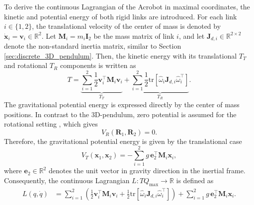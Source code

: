 To derive the continuous Lagrangian of the Acrobot in maximal coordinates, the
kinetic and potential energy of both rigid links are introduced. For each link
\(i\in\{1,2\}\), the translational velocity of the center of mass is denoted by
\(\dot{\bm{x}}_i=\bm{v}_i\in\mathbb{R}^2\). Let $\bm{M}_i = m_i\bm{I}_2$ be the mass matrix of link \(i\), and let \(\bm{J}_{d,i}\in\mathbb{R}^{2\times 2}\)
denote the non-standard inertia matrix, similar to Section \ref{sec:discrete_3D_pendulum}. Then, the
kinetic energy with its translational $T_T$ and rotational $T_R$ components is written as
\begin{equation}
    T
    =
    \underbrace{
    \sum_{i=1}^{2}
    \frac{1}{2}\bm{v}_i^{\top}\bm{M}_i\bm{v}_i
    }_{T_T}
    +
    \underbrace{
    \sum_{i=1}^{2}
    \frac{1}{2}
    \mathrm{tr}
    \left[
        \hat{\omega}_i
        \bm{J}_{d,i}
        \hat{\omega}_i^{\top}
    \right]
    }_{T_R}.
    \label{eq:acrobot_kinetic_energy_split}
\end{equation}
The gravitational potential energy is expressed directly by the center of mass
positions. In contrast to the 3D-pendulum, zero potential is assumed for the rotational setting \cite{BrudigamManchester2021VariationalIntegrators}, 
which gives 
\begin{equation}
    V_R(\bm{R}_1,\bm{R}_2)=0.
    \label{eq:acrobot_rotation_potential_zero}
\end{equation}
Therefore, the gravitational potential energy is given by the translational case
\begin{equation}
    V_T(\bm{x}_1,\bm{x}_2)
    =
    -
    \sum_{i=1}^{2}
    g\,\bm{e}_2^{\top}\bm{M}_i\bm{x}_i,
    \label{eq:acrobot_potential_energy}
\end{equation}
where \(\bm{e}_2\in\mathbb{R}^2\) denotes the unit vector in gravity direction in the inertial frame.
Consequently, the continuous Lagrangian
\(L:TQ_{\mathrm{max}}\rightarrow\mathbb{R}\) is defined as
\begin{equation}
    \begin{aligned}
    L(q,\dot{q})
    &=
    \sum_{i=1}^{2}
    \left(
    \frac{1}{2}\bm{v}_i^{\top}\bm{M}_i\bm{v}_i
    +
    \frac{1}{2}
    \mathrm{tr}
    \left[
        \hat{\omega}_i
        \bm{J}_{d,i}
        \hat{\omega}_i^{\top}
    \right]
    \right)
    +
    \sum_{i=1}^{2}
    g\,\bm{e}_2^{\top}\bm{M}_i\bm{x}_i .
    \end{aligned}
    \label{eq:acrobot_continuous_lagrangian}
\end{equation}

